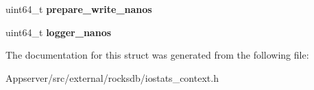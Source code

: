 \begin{DoxyCompactItemize}
\item 
uint64\+\_\+t {\bfseries prepare\+\_\+write\+\_\+nanos}\hypertarget{structrocksdb_1_1IOStatsContext_ae6c4c88ba3ab242ebf91d587b8411e89}{}\label{structrocksdb_1_1IOStatsContext_ae6c4c88ba3ab242ebf91d587b8411e89}

\item 
uint64\+\_\+t {\bfseries logger\+\_\+nanos}\hypertarget{structrocksdb_1_1IOStatsContext_a471f1802ac2a8cc8ac3334b1a1f79702}{}\label{structrocksdb_1_1IOStatsContext_a471f1802ac2a8cc8ac3334b1a1f79702}

\end{DoxyCompactItemize}


The documentation for this struct was generated from the following file\+:\begin{DoxyCompactItemize}
\item 
Appserver/src/external/rocksdb/iostats\+\_\+context.\+h\end{DoxyCompactItemize}
